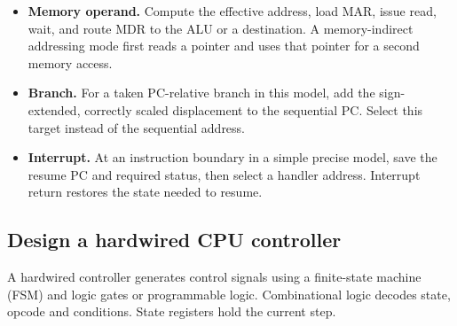 \documentclass[12pt,a4paper]{article}
\begin{document}
\begin{itemize}[leftmargin=*,itemsep=3pt]
\item \textbf{Memory operand.} Compute the effective address, load MAR, issue read, wait, and route MDR to the ALU or a destination. A memory-indirect addressing mode first reads a pointer and uses that pointer for a second memory access.
\item \textbf{Branch.} For a taken PC-relative branch in this model, add the sign-extended, correctly scaled displacement to the sequential PC. Select this target instead of the sequential address.
\item \textbf{Interrupt.} At an instruction boundary in a simple precise model, save the resume PC and required status, then select a handler address. Interrupt return restores the state needed to resume.
\end{itemize}

\subsection{Design a hardwired CPU controller}
\begin{tcolorbox}[defbox,title={Hardwired control}]
A hardwired controller generates control signals using a finite-state machine (FSM) and logic gates or programmable logic. Combinational logic decodes state, opcode and conditions. State registers hold the current step.
\end{tcolorbox}
\end{document}
